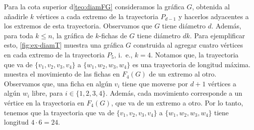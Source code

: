 Para la cota superior d\cref{teo:diamFG} consideramos la gr\'afica $G$, obtenida
al a\~{n}adirle $k$ v\'ertices a cada extremo de la trayectoria $P_{d -1}$ y
hacerlos adyacentes a los extremos de esta trayectoria. Observamos que $G$ tiene
di\'ametro $d$. Adem\'as, para toda $k \leq n$, la gr\'afica de $k$-fichas de
$G$ tiene di\'ametro $dk$. Para ejemplificar esto, \cref{fig:ex-diamT} muestra
una gr\'afica $G$ construida al agregar cuatro v\'ertices en cada extremo de la
trayectoria $P_5$, i.~e., $k=4$. Notamos que, la trayectoria que va de
$\{v_1,v_2,v_3,v_4\}$ a $\{w_1,w_2,w_3,w_4\}$ es una trayectoria de longitud
m\'axima.  muestra el movimiento de las fichas en $F_4(G)$ de
un extremo al otro. Observamos que, una ficha en alg\'un $v_i$ tiene que moverse
por $d +1$ v\'ertices a alg\'un $w_i$ libre, para $i \in \{1,2,3,4\}$. Adem\'as,
cada movimiento corresponde a un v\'ertice en la trayectoria en $F_4(G)$, que va
de un extremo a otro. Por lo tanto, tenemos que la trayectoria que va de
$\{v_1,v_2,v_3,v_4\}$ a $\{w_1,w_2,w_3,w_4\}$ tiene longitud $4 \cdot 6 = 24$.

